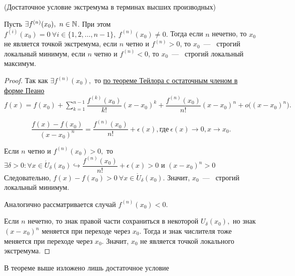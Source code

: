 \begin{theorem}
	\hypertarget{thrm5.23}{(Достаточное условие экстремума в терминах высших производных)} Пусть $\exists f^{(n)}(x_{0}), \ n \in \mathbb{N}$. При этом $f^{(i)} (x_{0}) = 0 \ \forall i \in \{1, 2, \ldots, n-1\}, \
		 f^{(n)} (x_{0}) \neq 0.$ Тогда если $n$ нечетно, то $x_{0}$ не является точкой экстремума, если $n$ четно и $f^{(n)} > 0$, то $x_{0}$~---~ строгий локальный минимум, если $n$ четно и $f^{(n)} < 0$, то $x_{0}$~---~ строгий локальный максимум.
\end{theorem}
\begin{proof}
	Так как $\exists f^{(n)}(x_{0}),$ то \hyperlink{thrm5.14}{по теореме Тейлора с остаточным членом в форме Пеано} $f(x) = f(x_{0}) + \sum\limits_{k = 1}^{n -1} \dfrac{f^{(k)}(x_{0})}{k!}(x-x_{0})^{k} + \dfrac{f^{(n)}(x_{0})}{n!}(x-x_{0})^{n} + o\Big((x-x_{0})^{n}\Big).$
	
	$$\dfrac{f(x)-f(x_{0})}{(x-x_{0})^{n}} = \dfrac{f^{(n)}(x_{0})}{n!} + \epsilon(x), \textrm{где} \ \epsilon(x) \to 0, x\to x_{0}.$$
	
	Если $n$ четно и $f^{(n)}(x_{0}) > 0,$ то $\exists \delta > 0: \forall  x\in \mathring{U}_{\delta}(x_{0}) \hookrightarrow \dfrac{f^{(n)}(x_{0})}{n!} + \epsilon(x) > 0 $ и $(x-x_{0})^{n} > 0 $ Следовательно, $f(x) - f(x_{0}) > 0\  \forall  x\in \mathring{U}_{\delta}(x_{0})$. Значит, $x_{0}$~---~ строгий локальный минимум.
	
	Аналогично рассматривается случай $f^{(n)}(x_{0}) < 0.$
	
	Если $n$ нечетно, то знак правой части сохраниться в некоторой $U_{\delta}(x_{0}),$ но знак $(x-x_{0})^{n}$ меняется при переходе через $x_{0}.$ Тогда и знак числителя тоже меняется при переходе через $x_{0}.$ Значит, $x_{0}$ не является точкой локального экстремума.
\end{proof}

\begin{note}
	В теореме выше изложено лишь достаточное условие
\end{note}

